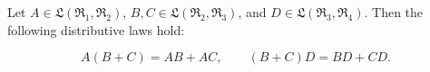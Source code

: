 Let $A \in \mathfrak{L}(\mathfrak{R}_1, \mathfrak{R}_2)$, $B, C \in \mathfrak{L}(\mathfrak{R}_2, \mathfrak{R}_3)$, and $D \in \mathfrak{L}(\mathfrak{R}_3, \mathfrak{R}_4)$. Then the following distributive laws hold:

$$A(B + C) = AB + AC, \qquad (B + C)D = BD + CD.$$
